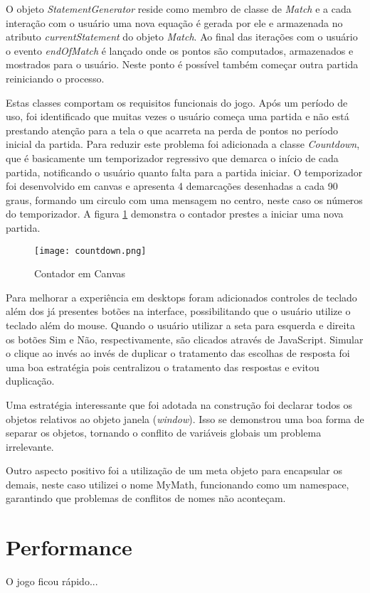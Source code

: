 O objeto \textit{StatementGenerator} reside como membro de classe de
\textit{Match} e a cada interação com o usuário uma nova equação
é gerada por ele e armazenada no atributo \textit{currentStatement}
do objeto \textit{Match}. Ao final das iterações com o usuário o
evento \textit{endOfMatch} é lançado onde os pontos são computados,
armazenados e mostrados para o usuário. Neste ponto é possível
também começar outra partida reiniciando o processo.

Estas classes comportam os requisitos funcionais do jogo. Após um
período de uso, foi identificado que muitas vezes o usuário começa
uma partida e não está prestando atenção para a tela o que acarreta
na perda de pontos no período inicial da partida. Para reduzir este
problema foi adicionada a classe \textit{Countdown}, que é basicamente
um temporizador regressivo que demarca o início de cada partida,
notificando o usuário quanto falta para a partida iniciar. O temporizador foi
desenvolvido em canvas e apresenta 4 demarcações desenhadas a cada 90
graus, formando um circulo com uma mensagem no centro, neste caso os
números do temporizador. A  figura \ref{fig:counter} demonstra o contador 
prestes a iniciar uma nova partida.

\begin{figure}
    \centering
    \texttt{[image: countdown.png]}
	\caption{Contador em Canvas}
    \label{fig:counter}
\end{figure}

Para melhorar a experiência em desktops foram adicionados controles de
teclado além dos já presentes botões na interface, possibilitando que
o usuário utilize o teclado além do mouse. Quando o usuário utilizar
a seta para esquerda e direita os botões Sim e Não, respectivamente,
são clicados através de JavaScript. Simular o clique ao invés ao
invés de duplicar o tratamento das escolhas de resposta foi uma boa
estratégia pois centralizou o tratamento das respostas e evitou
duplicação.

\begin{draft}
Uma estratégia interessante que foi adotada na construção foi
declarar todos os objetos relativos ao objeto janela (\textit{window}).
Isso se demonstrou uma boa forma de separar os objetos, tornando o
conflito de variáveis globais um problema irrelevante.

Outro aspecto positivo foi a utilização de um meta objeto para
encapsular os demais, neste caso utilizei o nome MyMath, funcionando
como um namespace, garantindo que problemas de conflitos de nomes não
aconteçam.


\section{Performance}

O jogo ficou rápido...

\end{draft}
